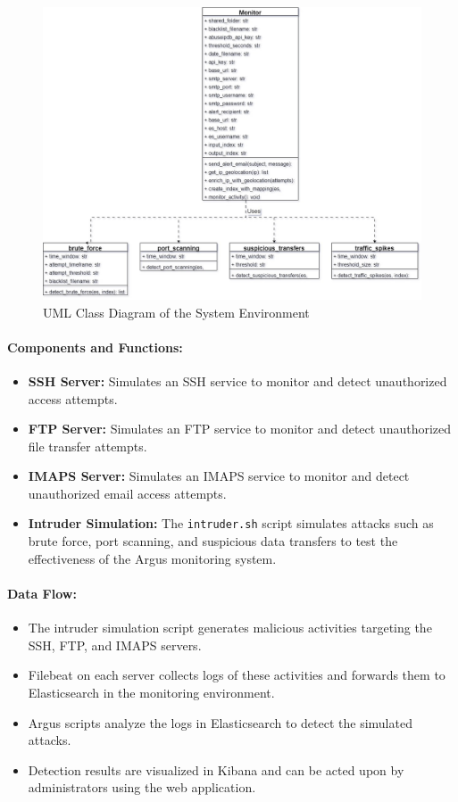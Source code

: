 \documentclass{article}
\begin{document}
    \begin{figure}[H]
        \centering
        \includegraphics[width=\textwidth]{./images/uml.jpg}
        \caption{UML Class Diagram of the System Environment}
        \label{fig:uml_diagram}
    \end{figure}

    \paragraph{Components and Functions:}
    \begin{itemize}
        \item \textbf{SSH Server:} Simulates an SSH service to monitor and detect unauthorized access attempts.
        \item \textbf{FTP Server:} Simulates an FTP service to monitor and detect unauthorized file transfer attempts.
        \item \textbf{IMAPS Server:} Simulates an IMAPS service to monitor and detect unauthorized email access attempts.
        \item \textbf{Intruder Simulation:} The \texttt{intruder.sh} script simulates attacks such as brute force, port scanning, and suspicious data transfers to test the effectiveness of the Argus monitoring system.
    \end{itemize}

    \newpage
    \paragraph{Data Flow:}
    \begin{itemize}
        \item The intruder simulation script generates malicious activities targeting the SSH, FTP, and IMAPS servers.
        \item Filebeat on each server collects logs of these activities and forwards them to Elasticsearch in the monitoring environment.
        \item Argus scripts analyze the logs in Elasticsearch to detect the simulated attacks.
        \item Detection results are visualized in Kibana and can be acted upon by administrators using the web application.
    \end{itemize}
\end{document}
